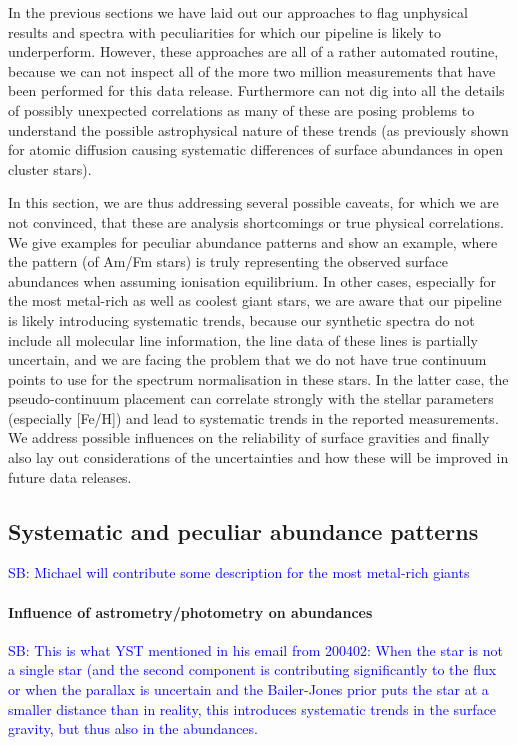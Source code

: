 \documentclass[fleqn,usenatbib,useAMS]{mnras}
\newcommand\SB[1]{\textcolor{blue}{SB: #1}}
\begin{document}
In the previous sections we have laid out our approaches to flag unphysical results and spectra with peculiarities for which our pipeline is likely to underperform. However, these approaches are all of a rather automated routine, because we can not inspect all of the more two million measurements that have been performed for this data release. Furthermore can not dig into all the details of possibly unexpected correlations as many of these are posing problems to understand the possible astrophysical nature of these trends (as previously shown for atomic diffusion causing systematic differences of surface abundances in open cluster stars).

In this section, we are thus addressing several possible caveats, for which we are not convinced, that these are analysis shortcomings or true physical correlations. We give examples for peculiar abundance patterns and show an example, where the pattern (of Am/Fm stars) is truly representing the observed surface abundances when assuming ionisation equilibrium. In other cases, especially for the most metal-rich as well as coolest giant stars, we are aware that our pipeline is likely introducing systematic trends, because our synthetic spectra do not include all molecular line information, the line data of these lines is partially uncertain, and we are facing the problem that we do not have true continuum points to use for the spectrum normalisation in these stars. In the latter case, the pseudo-continuum placement can correlate strongly with the stellar parameters (especially [Fe/H]) and lead to systematic trends in the reported measurements. We address possible influences on the reliability of surface gravities and finally also lay out considerations of the uncertainties and how these will be improved in future data releases.

\subsection{Systematic and peculiar abundance patterns}

\SB{Michael will contribute some description for the most metal-rich giants}

\paragraph*{Influence of astrometry/photometry on abundances}

\SB{This is what YST mentioned in his email from 200402: When the star is not a single star (and the second component is contributing significantly to the flux or when the parallax is uncertain and the Bailer-Jones prior puts the star at a smaller distance than in reality, this introduces systematic trends in the surface gravity, but thus also in the abundances.}
\end{document}
